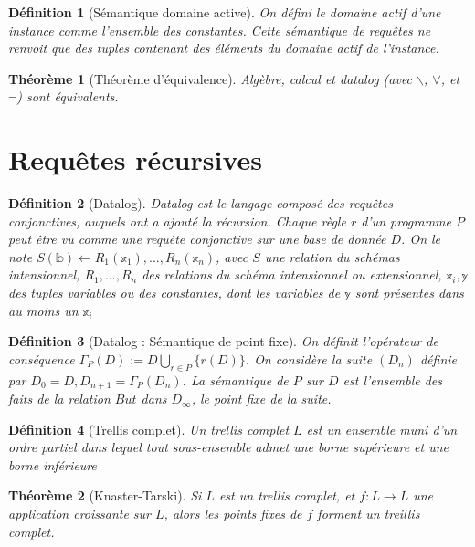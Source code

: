 \documentclass[landscape]{article}
\newcommand{\1}{\mathbbm{1}}
\newcommand{\0}{\mathbbm{0}}
\newtheorem{theo}{Théorème}
\newtheorem{defi}{Définition}
\begin{document}
\begin{multicols}{2}
    \begin{defi}[Sémantique domaine active]
        On défini le domaine actif d'une instance comme l'ensemble des constantes.
        Cette sémantique de requêtes ne renvoit que des tuples contenant des éléments
        du domaine actif de l'instance.
    \end{defi}

    \begin{theo}[Théorème d'équivalence]
        Algèbre, calcul et datalog (avec $\backslash$, $\forall$, et $\neg$) sont
        équivalents.
    \end{theo}

    \section{Requêtes récursives}

    \begin{defi}[Datalog]
      Datalog est le langage composé des requêtes conjonctives, auquels ont a
      ajouté la récursion. Chaque règle $r$ d'un programme $P$ peut être vu
      comme une requête conjonctive sur une base de donnée $D$. On le note
      $S(\mathbb{b}) \leftarrow R_1(\mathbb{x}_1),...,R_n(\mathbb{x}_n)$, avec
      $S$ une relation du schémas intensionnel, $R_1,...,R_n$ des relations du
      schéma intensionnel ou extensionnel, $\mathbb{x}_i,\mathbb{y}$ des
      tuples variables ou des constantes, dont les variables de $\mathbb{y}$
      sont présentes dans au moins un $\mathbb{x}_i$
    \end{defi}
    
    \begin{defi}[Datalog : Sémantique de point fixe]
      On définit l'opérateur de conséquence 
      $\Gamma_P(D) := D \bigcup_{r\in P}\{r(D)\}$. On considère la suite $(D_n)$
      définie par $D_0 = D, D_{n+1} = \Gamma_P(D_n)$. La sémantique de $P$ sur
      $D$ est l'ensemble des faits de la relation $But$ dans $D_\infty$, le
      point fixe de la suite.
    \end{defi}

    \begin{defi}[Trellis complet]
      Un trellis complet $L$ est un ensemble muni d'un ordre partiel dans lequel
      tout sous-ensemble admet une borne supérieure et une borne inférieure
    \end{defi}
    
    \begin{theo}[Knaster-Tarski]
      Si $L$ est un trellis complet, et $f : L \rightarrow L$ une application
      croissante sur $L$, alors les points fixes de $f$ forment un treillis complet.
    \end{theo}


\end{multicols}
\end{document}
